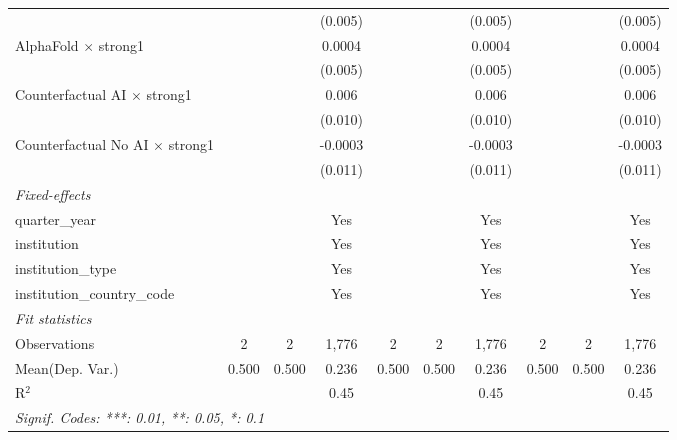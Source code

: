 \begin{tabular}{lccccccccc}
                                          &     &     & (0.005)     &     &     & (0.005)     &     &     & (0.005)\\   
   AlphaFold $\times$ strong1             &     &     & 0.0004      &     &     & 0.0004      &     &     & 0.0004\\   
                                          &     &     & (0.005)     &     &     & (0.005)     &     &     & (0.005)\\   
   Counterfactual AI $\times$ strong1     &     &     & 0.006       &     &     & 0.006       &     &     & 0.006\\   
                                          &     &     & (0.010)     &     &     & (0.010)     &     &     & (0.010)\\   
   Counterfactual No AI $\times$ strong1  &     &     & -0.0003     &     &     & -0.0003     &     &     & -0.0003\\   
                                          &     &     & (0.011)     &     &     & (0.011)     &     &     & (0.011)\\   
   \midrule
   \emph{Fixed-effects}\\
   quarter\_year                          &     &     & Yes         &     &     & Yes         &     &     & Yes\\  
   institution                            &     &     & Yes         &     &     & Yes         &     &     & Yes\\  
   institution\_type                      &     &     & Yes         &     &     & Yes         &     &     & Yes\\  
   institution\_country\_code             &     &     & Yes         &     &     & Yes         &     &     & Yes\\  
   \midrule
   \emph{Fit statistics}\\
   Observations                           & 2   & 2   & 1,776       & 2   & 2   & 1,776       & 2   & 2   & 1,776\\  
Mean(Dep. Var.) & 0.500 & 0.500 & 0.236 & 0.500 & 0.500 & 0.236 & 0.500 & 0.500 & 0.236 \\
   R$^2$                                  &     &     & 0.45        &     &     & 0.45        &     &     & 0.45\\  
   \midrule \midrule
   \multicolumn{10}{l}{\emph{Signif. Codes: ***: 0.01, **: 0.05, *: 0.1}}\\
\end{tabular}
\par\endgroup
